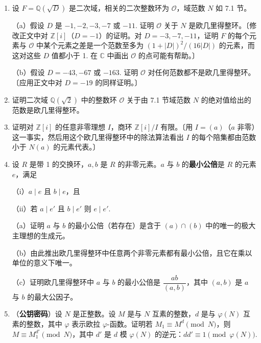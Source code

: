 \begin{enumerate}
\noindent 已知（但不太容易证明）\(D = -1, -2, -3, -7, -11, -19, -43, -67, -163\) 是使 \(\mathcal{O}\) 中每个理想都是主理想（即下一节术语中的 \(\mathcal{O}\) 是 P.I.D.）的仅有的 \(D\) 的负值。下一习题的结果精确确定哪些 \(D < 0\) 的二次整数环是欧几里得的。

\item 设 \(F = \mathbb{Q}(\sqrt{D})\) 是二次域，相关的二次整数环为 \(\mathcal{O}\)，域范数 \(N\) 如 7.1 节。

（a）假设 \(D\) 是 \(-1, -2, -3, -7\) 或 \(-11\). 证明 \(\mathcal{O}\) 关于 \(N\) 是欧几里得整环。〔修改正文中对 \(\mathbb{Z}[i]\)（\(D = -1\)）的证明。对 \(D = -3, -7, -11\)，证明 \(F\) 的每个元素与 \(\mathcal{O}\) 中某个元素之差是一个范数至多为 \((1+|D|)^2/(16|D|)\) 的元素，而这对这些 \(D\) 值都小于 1. 在 \(\mathbb{C}\) 中画出 \(\mathcal{O}\) 的点可能有帮助。〕

（b）假设 \(D = -43, -67\) 或 \(-163\). 证明 \(\mathcal{O}\) 对任何范数都不是欧几里得整环。〔应用正文中对 \(D = -19\) 的同样证明。〕

\item 证明二次域 \(\mathbb{Q}(\sqrt{2})\) 中的整数环 \(\mathcal{O}\) 关于由 7.1 节域范数 \(N\) 的绝对值给出的范数是欧几里得整环。

\item 证明对 \(\mathbb{Z}[i]\) 的任意非零理想 \(I\)，商环 \(\mathbb{Z}[i]/I\) 有限。〔用 \(I = (a)\)（\(a\) 非零）这一事实，然后用这个欧几里得整环中的除法算法看出 \(I\) 的每个陪集都由范数小于 \(N(a)\) 的元素代表。〕

\item 设 \(R\) 是带 1 的交换环，\(a, b\) 是 \(R\) 的非零元素。\(a\) 与 \(b\) 的\textbf{最小公倍}是 \(R\) 的元素 \(e\)，满足

（i）\(a \mid e\) 且 \(b \mid e\)，且

（ii）若 \(a \mid e'\) 且 \(b \mid e'\) 则 \(e \mid e'\).

（a）证明 \(a\) 与 \(b\) 的最小公倍（若存在）是含于 \((a) \cap (b)\) 中的唯一的极大主理想的生成元。

（b）由此推出欧几里得整环中任意两个非零元素都有最小公倍，且它在乘以单位的意义下唯一。

（c）证明欧几里得整环中 \(a\) 与 \(b\) 的最小公倍是 \(\dfrac{ab}{(a, b)}\)，其中 \((a, b)\) 是 \(a\) 与 \(b\) 的最大公因子。

\item （\textbf{公钥密码}）设 \(N\) 是正整数。设 \(M\) 是与 \(N\) 互素的整数，\(d\) 是与 \(\varphi(N)\) 互素的整数，其中 \(\varphi\) 表示欧拉 \(\varphi\)-函数。证明若 \(M_1 \equiv M^d \pmod N\)，则 \(M \equiv M_1^{d'} \pmod N\)，其中 \(d'\) 是 \(d\) 模 \(\varphi(N)\) 的逆元：\(dd' \equiv 1 \pmod{\varphi(N)}\).


\end{enumerate}
